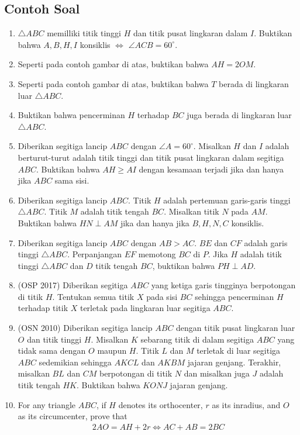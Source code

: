 \documentclass[12pt]{scrartcl}
\begin{document}
\subsection{Contoh Soal}
\begin{enumerate}

\item $\triangle ABC$ memilliki titik tinggi $H$ dan titik pusat lingkaran dalam $I$. Buktikan bahwa $A,B,H,I$ konsiklis $\iff$ $\angle ACB = 60^\circ$.

\item Seperti pada contoh gambar di atas, buktikan bahwa $AH=2OM$.

\item Seperti pada contoh gambar di atas, buktikan bahwa $T$ berada di lingkaran luar $\triangle ABC$.

\item Buktikan bahwa pencerminan $H$ terhadap $BC$ juga berada di lingkaran luar $\triangle ABC$.

 \item Diberikan segitiga lancip $ABC$ dengan $\angle A = 60^\circ$. Misalkan $H$ dan $I$ adalah berturut-turut adalah titik tinggi dan titik pusat lingkaran dalam segitiga $ABC$. Buktikan bahwa $AH \ge AI$ dengan kesamaan terjadi jika dan hanya jika $ABC$ sama sisi.

 \item Diberikan segitiga lancip $ABC$. Titik $H$ adalah pertemuan garis-garis tinggi $\triangle ABC$. Titik $M$ adalah titik tengah  $BC$. Misalkan titik $N$ pada $AM$. Buktikan bahwa $HN \perp AM$ jika dan hanya jika $B,H,N,C$ konsiklis.

 \item Diberikan segitiga lancip $ABC$ dengan $AB>AC$. $BE$ dan $CF$ adalah garis tinggi $\triangle ABC$. Perpanjangan $EF$ memotong $BC$ di $P$. Jika $H$ adalah titik tinggi $\triangle ABC$ dan $D$ titik tengah $BC$, buktikan bahwa $PH \perp AD$.

 \item (OSP 2017) Diberikan segitiga $ABC$ yang ketiga garis tingginya berpotongan di titik $H$. Tentukan semua titik $X$ pada sisi $BC$ sehingga pencerminan $H$ terhadap titik $X$ terletak pada lingkaran luar segitiga $ABC$.

 \item (OSN 2010) Diberikan segitiga lancip $ABC$ dengan titik pusat lingkaran luar $O$ dan titik tinggi $H$. Misalkan $K$ sebarang titik di dalam segitiga $ABC$ yang tidak sama dengan $O$ maupun $H$. Titik $L$ dan $M$ terletak di luar segitiga $ABC$ sedemikian sehingga $AKCL$ dan $AKBM$ jajaran genjang. Terakhir, misalkan $BL$ dan $CM$ berpotongan di titik $N$ dan misalkan juga $J$ adalah titik tengah $HK$. Buktikan bahwa $KONJ$ jajaran genjang.

 \item For any triangle $ABC$, if $H$ denotes its orthocenter, $r$ as its inradius, and $O$ as its circumcenter, prove that 
 \begin{align*}
     2AO = AH + 2r \iff AC+AB=2BC
 \end{align*}
 \end{enumerate}
\end{document}
